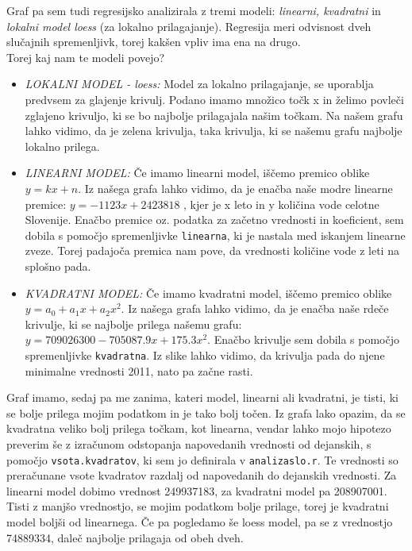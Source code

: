 \documentclass[11pt,a4paper]{article}
\begin{document}

Graf pa sem tudi regresijsko analizirala z tremi modeli: \emph{linearni, kvadratni} in \emph{lokalni model loess} (za lokalno prilagajanje). Regresija meri odvisnost dveh slučajnih spremenljivk, torej kakšen vpliv ima ena na drugo.\\
Torej kaj nam te modeli povejo?
\begin{itemize}
\item{\emph{LOKALNI MODEL - loess:} Model za lokalno prilagajanje, se uporablja predvsem za glajenje krivulj. Podano imamo množico točk x in želimo povleči zglajeno krivuljo, ki se bo najbolje prilagajala našim točkam. Na našem grafu lahko vidimo, da je zelena krivulja, taka krivulja, ki se našemu grafu najbolje lokalno prilega.}
\newpage
\item{\emph{LINEARNI MODEL:} Če imamo linearni model, iščemo premico oblike $y = kx + n$. Iz našega grafa lahko vidimo, da je enačba naše modre linearne premice: $y = -1123x + 2423818$ , kjer je x leto in y količina vode celotne Slovenije. Enačbo premice oz. podatka za začetno vrednosti in koeficient, sem dobila s pomočjo spremenljivke \verb|linearna|, ki je nastala med iskanjem linearne zveze. Torej padajoča premica nam pove, da vrednosti količine vode z leti na splošno pada.}

\item{\emph{KVADRATNI MODEL:} Če imamo kvadratni model, iščemo premico oblike $y = a_0 + a_1x +a_2x^2$. Iz našega grafa lahko vidimo, da je enačba naše rdeče krivulje, ki se najbolje prilega našemu grafu: $y = 709026300 - 705087.9x + 175.3x^2$. Enačbo krivulje sem dobila s pomočjo spremenljivke \verb|kvadratna|. Iz slike lahko vidimo, da krivulja pada do njene minimalne vrednosti 2011, nato pa začne rasti.}
\end{itemize}

Graf imamo, sedaj pa me zanima, kateri model, linearni ali kvadratni, je tisti, ki se bolje prilega mojim podatkom in je tako bolj točen. Iz grafa lako opazim, da se kvadratna veliko bolj prilega točkam, kot linearna, vendar lahko mojo hipotezo preverim še z izračunom odstopanja napovedanih vrednosti od dejanskih, s pomočjo \verb|vsota.kvadratov|, ki sem jo definirala v \verb|analizaslo.r|. Te vrednosti so preračunane vsote kvadratov razdalj od napovedanih do dejanskih vrednosti. Za linearni model dobimo vrednost 249937183, za kvadratni model pa 208907001. Tisti z manjšo vrednostjo, se mojim podatkom bolje prilage, torej je kvadratni model boljši od linearnega. Če pa pogledamo še loess model, pa se z vrednostjo 74889334, daleč najbolje prilagaja od obeh dveh.\\
\end{document}
